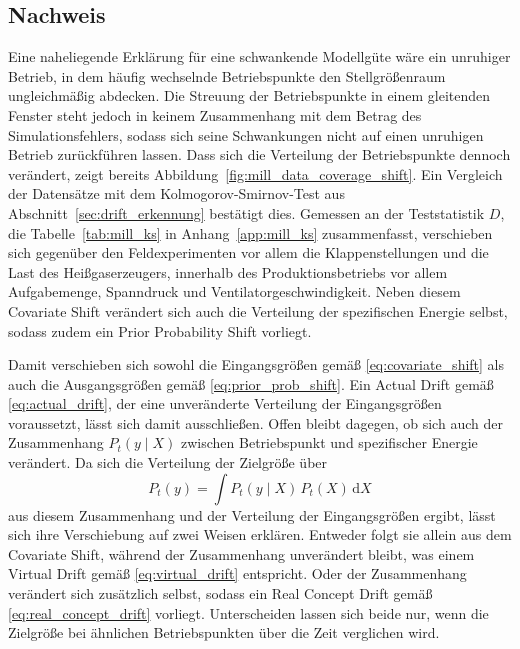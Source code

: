 \subsection{Nachweis} \label{sec:mill_kontext_nachweis}
%
Eine naheliegende Erklärung für eine schwankende Modellgüte wäre ein unruhiger Betrieb, in dem häufig wechselnde Betriebspunkte den Stellgrößenraum ungleichmäßig abdecken. Die Streuung der Betriebspunkte in einem gleitenden Fenster steht jedoch in keinem Zusammenhang mit dem Betrag des Simulationsfehlers, sodass sich seine Schwankungen nicht auf einen unruhigen Betrieb zurückführen lassen.
Dass sich die Verteilung der Betriebspunkte dennoch verändert, zeigt bereits Abbildung~\ref{fig:mill_data_coverage_shift}. Ein Vergleich der Datensätze mit dem Kolmogorov-Smirnov-Test aus Abschnitt~\ref{sec:drift_erkennung} bestätigt dies. Gemessen an der Teststatistik $D$, die Tabelle~\ref{tab:mill_ks} in Anhang~\ref{app:mill_ks} zusammenfasst, verschieben sich gegenüber den Feldexperimenten vor allem die Klappenstellungen und die Last des Heißgaserzeugers, innerhalb des Produktionsbetriebs vor allem Aufgabemenge, Spanndruck und Ventilatorgeschwindigkeit. Neben diesem Covariate Shift verändert sich auch die Verteilung der spezifischen Energie selbst, sodass zudem ein Prior Probability Shift vorliegt. \par
%
Damit verschieben sich sowohl die Eingangsgrößen gemäß \eqref{eq:covariate_shift} als auch die Ausgangsgrößen gemäß \eqref{eq:prior_prob_shift}. Ein Actual Drift gemäß \eqref{eq:actual_drift}, der eine unveränderte Verteilung der Eingangsgrößen voraussetzt, lässt sich damit ausschließen. Offen bleibt dagegen, ob sich auch der Zusammenhang $P_t(y \mid X)$ zwischen Betriebspunkt und spezifischer Energie verändert. Da sich die Verteilung der Zielgröße über 
%
\begin{equation}
    P_t(y) = \int P_t(y \mid X)\, P_t(X)\, \mathrm{d}X
    \label{eq:mill_marginal}
\end{equation}
%
aus diesem Zusammenhang und der Verteilung der Eingangsgrößen ergibt, lässt sich ihre Verschiebung auf zwei Weisen erklären. Entweder folgt sie allein aus dem Covariate Shift, während der Zusammenhang unverändert bleibt, was einem Virtual Drift gemäß \eqref{eq:virtual_drift} entspricht. Oder der Zusammenhang verändert sich zusätzlich selbst, sodass ein Real Concept Drift gemäß \eqref{eq:real_concept_drift} vorliegt. Unterscheiden lassen sich beide nur, wenn die Zielgröße bei ähnlichen Betriebspunkten über die Zeit verglichen wird. \par
